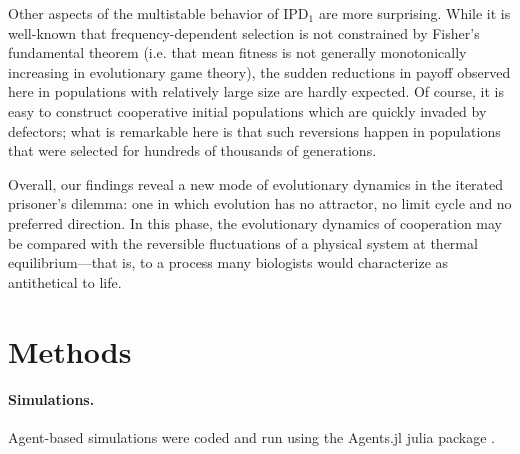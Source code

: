 \documentclass[12pt]{article}
\def\IPD{\textrm{IPD}}
\def\IPD1{\textrm{IPD}_1}
\begin{document}
Other aspects of the multistable behavior of $\IPD1$ are more surprising. While it is well-known that frequency-dependent selection is not constrained by Fisher's fundamental theorem (i.e. that mean fitness is not generally monotonically increasing in evolutionary game theory), the sudden reductions in payoff observed here in populations with relatively large size are hardly expected. Of course, it is easy to construct cooperative initial populations which are quickly invaded by defectors; what is remarkable here is that such reversions happen in populations that were selected for hundreds of thousands of generations. 

Overall, our findings reveal a new mode of evolutionary dynamics in the iterated prisoner's dilemma: one in which evolution has no attractor, no limit cycle and no preferred direction. In this phase, the evolutionary dynamics of cooperation may be compared with the reversible fluctuations of a physical system at thermal equilibrium---that is, to a process many biologists would characterize as antithetical to life. 

\section*{Methods}

\paragraph*{Simulations.}
Agent-based simulations were coded and run using the Agents.jl julia package \cite{datseris_agents_2021}. 

\printbibliography
\end{document}
